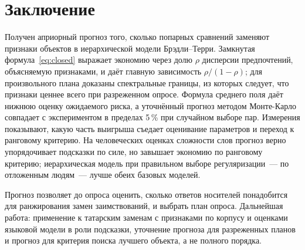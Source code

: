 \documentclass{article}
\theoremstyle{definition}
\theoremstyle{remark}
\begin{document}
\section{Заключение}

Получен априорный прогноз того, сколько попарных сравнений заменяют признаки объектов в иерархической модели Брэдли--Терри. Замкнутая формула~\eqref{eq:closed} выражает экономию через долю $\rho$ дисперсии предпочтений, объясняемую признаками, и даёт главную зависимость $\rho/(1-\rho)$; для произвольного плана доказаны спектральные границы, из которых следует, что признаки ценнее всего при разреженном опросе. Формула среднего поля даёт нижнюю оценку ожидаемого риска, а уточнённый прогноз методом Монте-Карло совпадает с экспериментом в пределах 5\,\% при случайном выборе пар. Измерения показывают, какую часть выигрыша съедает оценивание параметров и переход к ранговому критерию. На человеческих оценках сложности слов прогноз верно упорядочивает подсказки по силе, но завышает экономию по ранговому критерию; иерархическая модель при правильном выборе регуляризации~--- по отложенным людям~--- лучше обеих базовых моделей.

Прогноз позволяет до опроса оценить, сколько ответов носителей понадобится для ранжирования замен заимствований, и выбрать план опроса. Дальнейшая работа: применение к татарским заменам с признаками по корпусу и оценками языковой модели в роли подсказки, уточнение прогноза для разреженных планов и прогноз для критерия поиска лучшего объекта, а не полного порядка.



\end{document}
